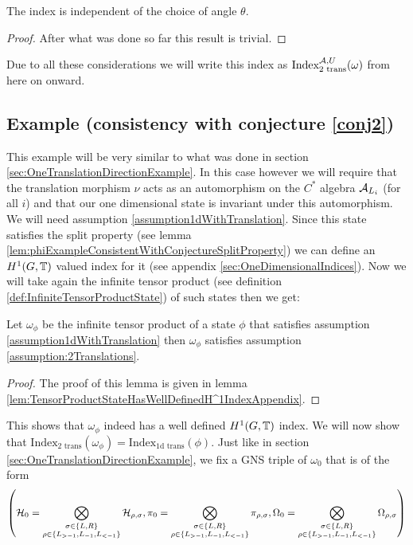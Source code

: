 \documentclass[11pt,a4paper,twoside]{article}
\numberwithin{equation}{section}
\begin{document}
\begin{lemma}
	The index is independent of the choice of angle $\theta$.
\end{lemma}
\begin{proof}
	After what was done so far this result is trivial.
\end{proof}
Due to all these considerations we will write this index as $\textrm{Index}_{2\text{ trans}}^{\AA,U}(\omega)$ from here on onward.
\subsection{Example (consistency with conjecture \ref{conj2})}\label{sec:TwoTranslationDirectionsExample}
This example will be very similar to what was done in section \ref{sec:OneTranslationDirectionExample}. In this case however we will require that the translation morphism $\nu$ acts as an automorphism on the $C^*$ algebra $\AA_{L_i}$ (for all $i$) and that our one dimensional state is invariant under this automorphism. We will need assumption \ref{assumption1dWithTranslation}. Since this state satisfies the split property (see lemma \ref{lem:phiExampleConsistentWithConjectureSplitProperty}) we can define an $H^1(G,\TT)$ valued index for it (see appendix \ref{sec:OneDimensionalIndices}). Now we will take again the infinite tensor product (see definition \ref{def:InfiniteTensorProductState}) of such states then we get:
\begin{lemma}
	Let $\omega_\phi$ be the infinite tensor product of a state $\phi$ that satisfies assumption \ref{assumption1dWithTranslation} then $\omega_\phi$ satisfies assumption \ref{assumption:2Translations}.
\end{lemma}
\begin{proof}
	The proof of this lemma is given in lemma \ref{lem:TensorProductStateHasWellDefinedH^1IndexAppendix}.
\end{proof}
This shows that $\omega_\phi$ indeed has a well defined $H^1(G,\TT)$ index. We will now show that $\textrm{Index}_{\text{2 trans}}(\omega_\phi)=\textrm{Index}_{\text{1d trans}}(\phi)$. Just like in section \ref{sec:OneTranslationDirectionExample}, we fix a GNS triple of $\omega_0$ that is of the form
\begin{equation}
	\left(\HH_0=\bigotimes_{\substack{\sigma\in\{L,R\}\\ \rho\in\{L_{>-1},L_{-1},L_{<-1}\}}}\HH_{\rho,\sigma},\pi_0=\bigotimes_{\substack{\sigma\in\{L,R\}\\ \rho\in\{L_{>-1},L_{-1},L_{<-1}\}}}\pi_{\rho,\sigma},\Omega_0=\bigotimes_{\substack{\sigma\in\{L,R\}\\ \rho\in\{L_{>-1},L_{-1},L_{<-1}\}}}\Omega_{\rho,\sigma}\right)
\end{equation}
\end{document}
